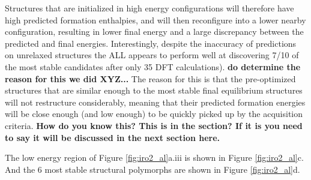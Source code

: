 %
Structures that are initialized in high energy configurations will therefore have high predicted formation enthalpies, and will then reconfigure into a lower nearby configuration, resulting in lower final energy and a large discrepancy between the predicted and final energies.
%
Interestingly, despite the inaccuracy of predictions on unrelaxed structures the ALL appears to perform well at discovering \num{7/10} of the most stable candidates after only \num{35} DFT calculations). \textbf{do determine the reason for this we did XYZ...}
%
The reason for this is that the pre-optimized structures that are similar enough to the most stable final equilibrium structures will not restructure considerably, meaning that their predicted formation energies will be close enough (and low enough) to be quickly picked up by the acquisition criteria. \textbf{How do you know this?  This is in the section?  If it is you need to say it will be discussed in the next section here.}
%


%
The low energy region of Figure \ref{fig:iro2_al}a.iii is shown in Figure \ref{fig:iro2_al}c.
%
And the \num{6} most stable structural polymorphs are shown in Figure \ref{fig:iro2_al}d. 



